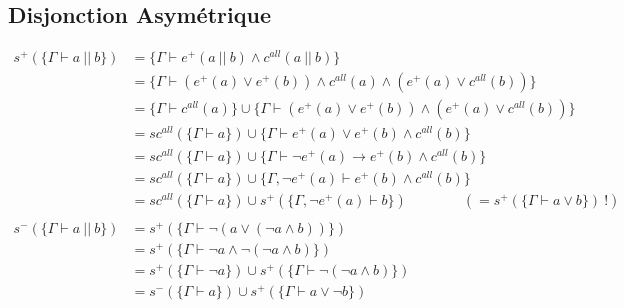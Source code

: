 \documentclass[12pt]{article}
\newcommand{\dbar}{~||~}
\begin{document}
\subsection*{Disjonction Asymétrique}
\begin{align*}
  s^+ (\{\Gamma \vdash a \dbar b\})      & = \{\Gamma \vdash e^+(a \dbar b) \land c^{all} (a \dbar b)\}                                                                   \\
                                         & = \{\Gamma \vdash (e^+(a) \lor e^+(b)) \land c^{all} (a) \land (e^+ (a) \lor c^{all} (b))\}                                    \\
                                         & = \{\Gamma \vdash c^{all} (a)\} \cup \{\Gamma \vdash (e^+(a) \lor e^+(b)) \land (e^+ (a) \lor c^{all} (b))\}                   \\
                                         & = sc^{all}(\{\Gamma \vdash a\}) \cup \{\Gamma \vdash e^+(a) \lor e^+(b) \land c^{all} (b)\}                                    \\
                                         & = sc^{all}(\{\Gamma \vdash a\}) \cup \{\Gamma \vdash \neg e^+(a) \rightarrow e^+(b) \land c^{all} (b)\}                        \\
                                         & = sc^{all}(\{\Gamma \vdash a\}) \cup \{\Gamma,\neg e^+(a) \vdash e^+(b) \land c^{all} (b)\}                                    \\
                                         & = sc^{all}(\{\Gamma \vdash a\}) \cup s^+ (\{\Gamma,\neg e^+(a) \vdash b\}) \qquad\qquad (= s^+ (\{\Gamma \vdash a \lor b\})~!) \\
  \\
  s^- (\{\Gamma \vdash a \dbar b\})      & = s^+ (\{\Gamma \vdash \neg (a \lor (\neg a \land b))\})                                                                       \\
                                         & = s^+ (\{\Gamma \vdash \neg a \land \neg (\neg a \land b)\})                                                                   \\
                                         & = s^+ (\{\Gamma \vdash \neg a\}) \cup s^+ (\{\Gamma \vdash \neg (\neg a \land b)\})                                            \\
                                         & = s^- (\{\Gamma \vdash a\}) \cup s^+ (\{\Gamma \vdash a \lor \neg b\})                                                         \\

\end{align*}
\end{document}
